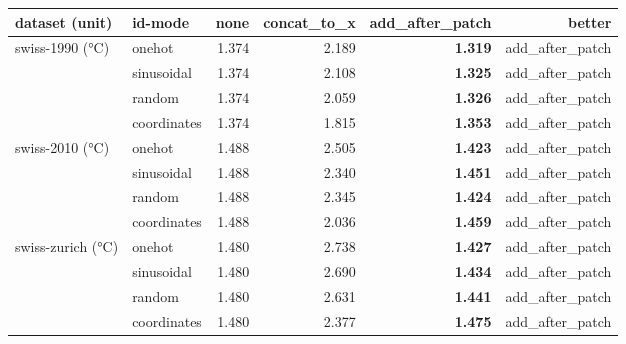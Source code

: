 \documentclass[border=6pt]{standalone}
\begin{document}
\begin{tabular}{llrrrr}
\toprule
dataset (unit) & id-mode & none & concat\_to\_x & add\_after\_patch & better \\
\midrule
swiss-1990 (°C) & onehot & 1.374 & 2.189 & \textbf{1.319} & add\_after\_patch \\
 & sinusoidal & 1.374 & 2.108 & \textbf{1.325} & add\_after\_patch \\
 & random & 1.374 & 2.059 & \textbf{1.326} & add\_after\_patch \\
 & coordinates & 1.374 & 1.815 & \textbf{1.353} & add\_after\_patch \\
\midrule
swiss-2010 (°C) & onehot & 1.488 & 2.505 & \textbf{1.423} & add\_after\_patch \\
 & sinusoidal & 1.488 & 2.340 & \textbf{1.451} & add\_after\_patch \\
 & random & 1.488 & 2.345 & \textbf{1.424} & add\_after\_patch \\
 & coordinates & 1.488 & 2.036 & \textbf{1.459} & add\_after\_patch \\
\midrule
swiss-zurich (°C) & onehot & 1.480 & 2.738 & \textbf{1.427} & add\_after\_patch \\
 & sinusoidal & 1.480 & 2.690 & \textbf{1.434} & add\_after\_patch \\
 & random & 1.480 & 2.631 & \textbf{1.441} & add\_after\_patch \\
 & coordinates & 1.480 & 2.377 & \textbf{1.475} & add\_after\_patch \\
\bottomrule
\end{tabular}
\end{document}
